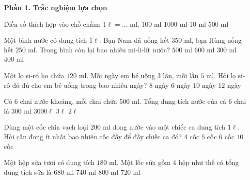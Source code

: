 \textbf{Phần 1. Trắc nghiệm lựa chọn}

\begin{ex} %
Điền số thích hợp vào chỗ chấm: $1\ell = \dots\text{ ml}$.
\choice
{$100\text{ ml}$}
{\True $1000\text{ ml}$}
{$10\text{ ml}$}
{$500\text{ ml}$}
\end{ex}

\begin{ex} %
Một bình nước có dung tích $1\ell$. Bạn Nam đã uống hết $350\text{ ml}$, bạn Hùng uống hết $250\text{ ml}$. Trong bình còn lại bao nhiêu mi-li-lít nước?
\choice
{$500\text{ ml}$}
{$600\text{ ml}$}
{$300\text{ ml}$}
{\True $400\text{ ml}$}
\end{ex}

\begin{ex} %
Một lọ si-rô ho chứa $120\text{ ml}$. Mỗi ngày em bé uống 3 lần, mỗi lần $5\text{ ml}$. Hỏi lọ si-rô đó đủ cho em bé uống trong bao nhiêu ngày?
\choice
{\True $8$ ngày}
{$6$ ngày}
{$10$ ngày}
{$12$ ngày}
\end{ex}

\begin{ex} %
Có 6 chai nước khoáng, mỗi chai chứa $500\text{ ml}$. Tổng dung tích nước của cả 6 chai là
\choice
{$300\text{ ml}$}
{$3000\ell$}
{\True $3\ell$}
{$2\ell$}
\end{ex}

\begin{ex} %
Dùng một cốc chia vạch loại $200\text{ ml}$ đong nước vào một chiếc ca dung tích $1\ell$. Hỏi cần đong ít nhất bao nhiêu cốc đầy để đầy chiếc ca đó?
\choice
{$4$ cốc}
{\True $5$ cốc}
{$6$ cốc}
{$10$ cốc}
\end{ex}

\begin{ex} %
Một hộp sữa tươi có dung tích $180\text{ ml}$. Một lốc sữa gồm 4 hộp như thế có tổng dung tích sữa là
\choice
{$680\text{ ml}$}
{$740\text{ ml}$}
{$800\text{ ml}$}
{\True $720\text{ ml}$}
\end{ex}

